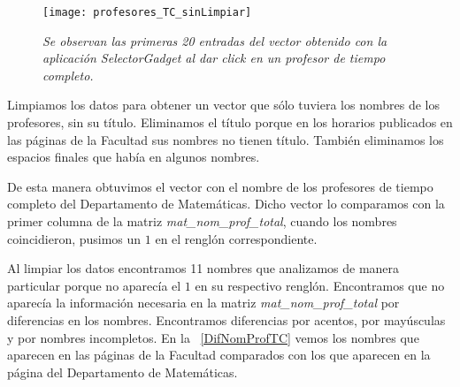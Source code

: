 \begin{figure}[H]
\centering
\texttt{[image: profesores\_TC\_sinLimpiar]} %
\caption[\textit{Vector de profesores de tiempo completo}]{\textit{Se observan las primeras 20 entradas del vector obtenido con la aplicación SelectorGadget al dar click en un profesor de tiempo completo.}}\label{profTC_sinLimpiar}
\end{figure}

Limpiamos los datos para obtener un vector que sólo tuviera los nombres de los profesores, sin su título. Eliminamos el título porque en los horarios publicados en las páginas de la Facultad sus nombres no tienen título. También eliminamos los espacios finales que había en algunos nombres.

De esta manera obtuvimos el vector con el nombre de los profesores de tiempo completo del Departamento de Matemáticas. Dicho vector lo comparamos con la primer columna de la matriz \textit{mat\_nom\_prof\_total}, cuando los nombres coincidieron, pusimos un $1$ en el renglón correspondiente.

Al limpiar los datos encontramos 11 nombres que analizamos de manera particular porque no aparecía el $1$ en su respectivo renglón. Encontramos que no aparecía la información necesaria en la matriz \textit{mat\_nom\_prof\_total} por diferencias en los nombres. Encontramos diferencias por acentos, por mayúsculas y por nombres incompletos. En la \tablename{~\ref{DifNomProfTC}} vemos los nombres que aparecen en las páginas de la Facultad comparados con los que aparecen en la página del Departamento de Matemáticas.

